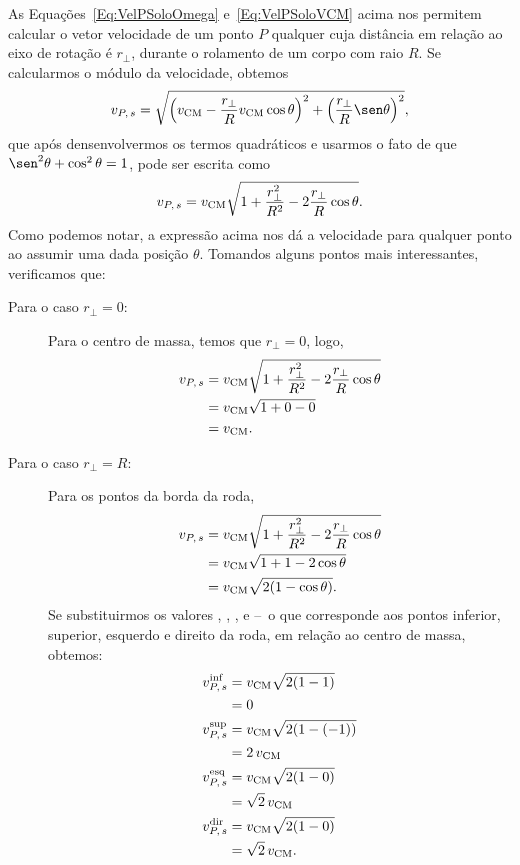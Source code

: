 As Equações~\eqref{Eq:VelPSoloOmega} e~\eqref{Eq:VelPSoloVCM} acima nos permitem calcular o vetor velocidade de um ponto $P$ qualquer cuja distância em relação ao eixo de rotação é $r_\perp$, durante o rolamento de um corpo com raio $R$. Se calcularmos o módulo da velocidade, obtemos
\begin{equation}
    v_{P,\,s} = \sqrt{\left(v_{\rm{CM}} - \frac{r_\perp}{R} v_{\rm{CM}}\cos\theta\right)^2 + \left(\frac{r_\perp}{R}\sen\theta\right)^2},
\end{equation}
%
que após densenvolvermos os termos quadráticos e usarmos o fato de que $\sen^2\theta + \cos^2\theta = 1$, pode ser escrita como
\begin{equation}\label{Eq:VelEscalarPontoRolamento}
    v_{P,\,s} = v_{\rm{CM}} \sqrt{1 + \frac{r_\perp^2}{R^2} - 2\frac{r_\perp}{R}\cos\theta}.
\end{equation}
%
Como podemos notar, a expressão acima nos dá a velocidade para qualquer ponto ao assumir uma dada posição $\theta$. Tomandos alguns pontos mais interessantes, verificamos que:
\begin{description}
    \item[Para o caso $r_\perp = 0$:] Para o centro de massa, temos que $r_\perp = 0$, logo,
        \begin{align}
            v_{P,\,s} &= v_{\rm{CM}} \sqrt{1 + \frac{r_\perp^2}{R^2} - 2\frac{r_\perp}{R}\cos\theta} \\
            &= v_{\rm{CM}} \sqrt{1 + 0 - 0} \\
            & = v_{\rm{CM}}.
        \end{align}
        
    \item[Para o caso $r_\perp = R$:] Para os pontos da borda da roda,
        \begin{align}
            v_{P,\,s} &= v_{\rm{CM}} \sqrt{1 + \frac{r_\perp^2}{R^2} - 2\frac{r_\perp}{R}\cos\theta} \\
            &= v_{\rm{CM}} \sqrt{1 + 1 - 2\cos\theta} \\
            & = v_{\rm{CM}} \sqrt{2(1-\cos\theta)}.
        \end{align}
        Se substituirmos os valores , , , e  --~o que corresponde aos pontos inferior, superior, esquerdo e direito da roda, em relação ao centro de massa, obtemos:
        \begin{align}
            v_{P,\,s}^{\rm{inf}} &= v_{\rm{CM}} \sqrt{2(1-1)} \\
            &= 0 \\
            v_{P,\,s}^{\rm{sup}} &= v_{\rm{CM}} \sqrt{2(1-(-1))} \\
            &= 2 \, v_{\rm{CM}} \\
            v_{P,\,s}^{\rm{esq}} &= v_{\rm{CM}} \sqrt{2(1-0)} \\
            &= \sqrt{2}\, v_{\rm{CM}} \\
            v_{P,\,s}^{\rm{dir}} &= v_{\rm{CM}} \sqrt{2(1-0)} \\
            &= \sqrt{2}\, v_{\rm{CM}}.
        \end{align}
\end{description}

